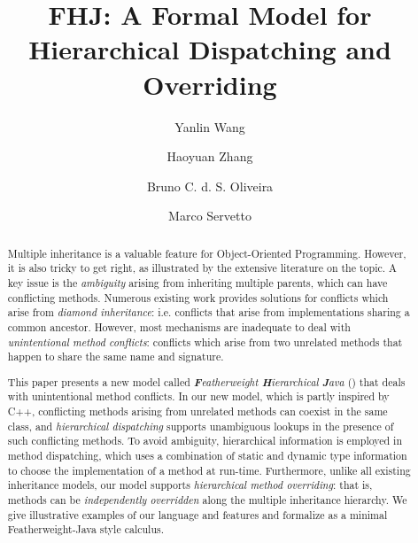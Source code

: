 \documentclass[a4paper,english]{lipics-v2016}
\title{FHJ: A Formal Model for Hierarchical Dispatching and Overriding}
\author[1]{Yanlin Wang}
\author[1]{Haoyuan Zhang}
\author[1]{Bruno C. d. S. Oliveira}
\affil[1]{The University of Hong Kong, China \\
	\texttt{\{yanlin,hyzhang,bruno\}@cs.hku.hk}}
\author[2]{Marco Servetto}
\affil[2]{Victoria University of Wellington, New Zealand \\
    \texttt{marco.servetto@ecs.vuw.ac.nz}}
\begin{document}
\maketitle

\begin{abstract}
Multiple inheritance is a valuable feature for Object-Oriented
Programming. However, it is also tricky to get right, as illustrated by
the extensive literature on the topic. A key issue 
is the \emph{ambiguity} arising from inheriting multiple parents,
which can have conflicting methods. 
Numerous existing work provides solutions for 
conflicts which arise from \emph{diamond inheritance}: i.e.
conflicts that arise from implementations sharing a common 
ancestor. However, most mechanisms are inadequate to deal 
with \emph{unintentional method conflicts}: conflicts which 
arise from two unrelated methods that happen to share the same name
and signature. 

\begin{comment}
One of the most promising 
approaches to multiple inheritance is the \emph{trait} model. Traits offer a
restricted model of multiple inheritance that is easy to reason and 
have many elegant properties. Traits have good support for method 
conflicts which arise from \emph{diamond inheritance}:
conflicts that arise from method implementations sharing a common 
ancestor. However, the mechanisms of traits are inadequate to deal 
with \emph{unintentional method conflicts}: conflicts which 
arise from two unrelated methods that happen to share the same name
and signature. 
\end{comment}

This paper presents a new model called \emph{\textbf{F}eatherweight
  \textbf{H}ierarchical \textbf{J}ava} (\name{}) that deals with
unintentional method conflicts.  In our new model, which is partly
inspired by C++, conflicting methods arising from unrelated methods
can coexist in the same class, and \emph{hierarchical dispatching}
supports unambiguous lookups in the presence of such conflicting
methods.  To avoid ambiguity, hierarchical information is employed in
method dispatching, which uses a combination of static and dynamic
type information to choose the implementation of a method at run-time.
Furthermore, unlike all existing inheritance models, our model
supports \emph{hierarchical method overriding}: that is, methods can
be \emph{independently overridden} along the multiple inheritance
hierarchy. We give illustrative examples of our language and features
and formalize \name{} as a minimal Featherweight-Java style calculus.

\begin{comment}
Furthermore we discuss similarities and differences to 


What ensures unambiguity is the use of information about
the class hierarchy.

\name{} is partly inspired by the method resolution semantics
of C++, but it also incoorporates ideas from the trait model and Java
8's default methods. We discuss the similarities
and differences with and also advantages and disadvantages. 
\end{comment}

 \end{abstract}
\end{document}
